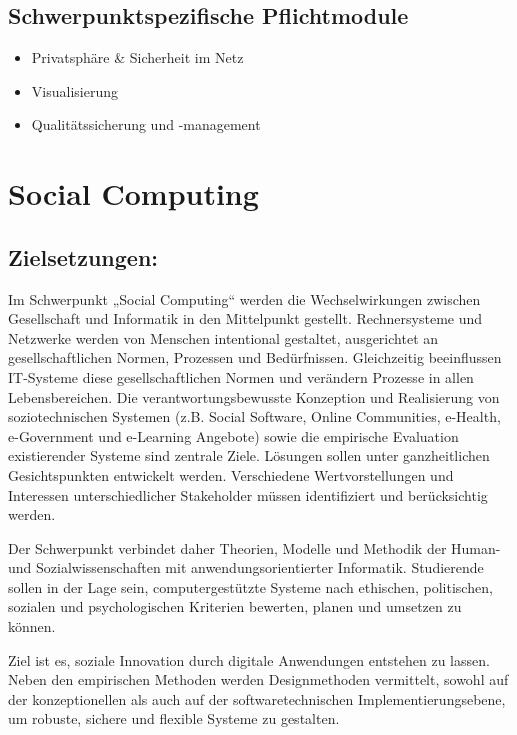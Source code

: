 \section*{Schwerpunktspezifische
Pflichtmodule}\label{schwerpunktspezifische-pflichtmodule-1}

\begin{itemize}
\item
  Privatsphäre \& Sicherheit im Netz
\item
  Visualisierung
\item
  Qualitätssicherung und -management
\end{itemize}

\chapter{Social Computing}\label{social-computing}

\section*{Zielsetzungen:}\label{zielsetzungen-1}

Im Schwerpunkt „Social Computing`` werden die Wechselwirkungen zwischen
Gesellschaft und Informatik in den Mittelpunkt gestellt. Rechnersysteme
und Netzwerke werden von Menschen intentional gestaltet, ausgerichtet an
gesellschaftlichen Normen, Prozessen und Bedürfnissen. Gleichzeitig
beeinflussen IT-Systeme diese gesellschaftlichen Normen und verändern
Prozesse in allen Lebensbereichen. Die verantwortungsbewusste Konzeption
und Realisierung von soziotechnischen Systemen (z.B. Social Software,
Online Communities, e-Health, e-Government und e-Learning Angebote)
sowie die empirische Evaluation existierender Systeme sind zentrale
Ziele. Lösungen sollen unter ganzheitlichen Gesichtspunkten entwickelt
werden. Verschiedene Wertvorstellungen und Interessen unterschiedlicher
Stakeholder müssen identifiziert und berücksichtig werden.

Der Schwerpunkt verbindet daher Theorien, Modelle und Methodik der
Human- und Sozialwissenschaften mit anwendungsorientierter Informatik.
Studierende sollen in der Lage sein, computergestützte Systeme nach
ethischen, politischen, sozialen und psychologischen Kriterien bewerten,
planen und umsetzen zu können.

Ziel ist es, soziale Innovation durch digitale Anwendungen entstehen zu
lassen. Neben den empirischen Methoden werden Designmethoden vermittelt,
sowohl auf der konzeptionellen als auch auf der softwaretechnischen
Implementierungsebene, um robuste, sichere und flexible Systeme zu
gestalten.

